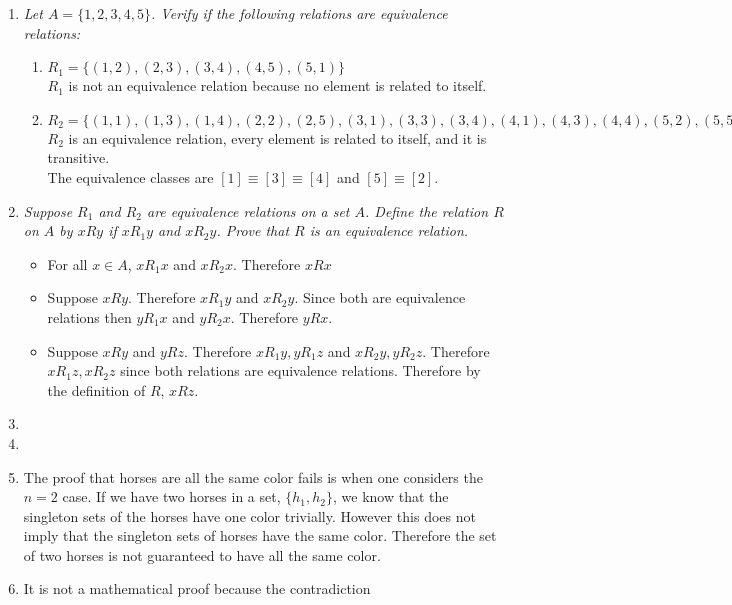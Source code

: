 \documentclass[12pt, letterpaper]{article}
\begin{document}
\begin{enumerate}
	
	\item \textit{Let $A = \{1, 2, 3, 4, 5\}$. Verify if the following relations are equivalence relations:}
	
	
	\begin{enumerate}
		\item $R_1 = \{(1, 2), (2, 3), (3, 4), (4, 5), (5, 1)\}$\\
		
		$R_1$ is not an equivalence relation because no element is related to itself.
		
		\item $
		R_2 = \{(1, 1), (1, 3), (1, 4), (2, 2), (2, 5), (3, 1), (3, 3), (3, 4), (4, 1), (4, 3), (4, 4), (5, 2), (5, 5)\}		
		$\\
		
		 $R_2$ is an equivalence relation, every element is related to itself, and it is transitive.\\  The equivalence classes are $[1] \equiv [3] \equiv [4]$ and $[5] \equiv [2]$.
	\end{enumerate}
	\item \textit{Suppose $R_1$ and $R_2$ are equivalence relations on a set $A$. Define the relation $R$ on $A$ by $xRy$ if
$xR_1y$ and $xR_2y$. Prove that $R$ is an equivalence relation.}
	\begin{itemize}
		\item For all $x \in A$, $xR_1x$ and $xR_2x$.  Therefore $xRx$
		\item Suppose $xRy$.  Therefore $xR_1y$ and $xR_2y$.  Since both are equivalence relations then $yR_1x$ and $y R_2 x$.  Therefore $yRx$.
		\item Suppose $xRy$ and $yRz$.  Therefore $xR_1y, yR_1z$ and $xR_2y, yR_2z$.  Therefore $xR_1z, xR_2z$ since both relations are equivalence relations.
		Therefore by the definition of $R$, $xRz$.    
	\end{itemize}
	\item 
	\item 
	\item The proof that horses are all the same color fails is when one considers the $n=2$ case.  If we have two horses in a set, $\{h_1, h_2\}$, we know that the singleton sets of the horses have one color trivially.  However this does not imply that the singleton sets of horses have the same color.  Therefore the set of two horses is not guaranteed to have all the same color.   
	\item It is not a mathematical proof because the contradiction 
\end{enumerate}
\end{document}
